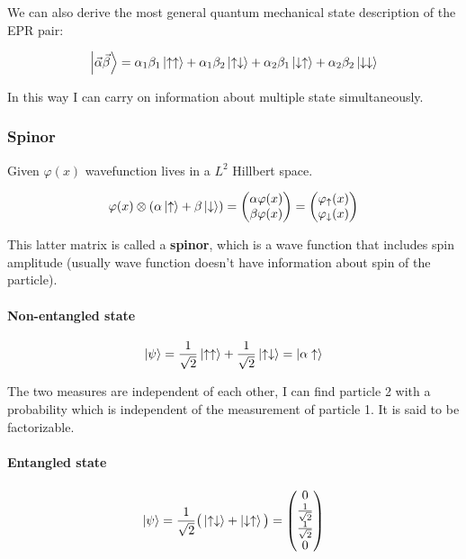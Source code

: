 		We can also derive the most general quantum mechanical state description of the EPR pair:

		$$\ket{\vec{\alpha}\vec{\beta}}=\alpha_1\beta_1\ket{\uparrow\uparrow}+\alpha_1\beta_2\ket{\uparrow\downarrow}+\alpha_2\beta_1\ket{\downarrow\uparrow}+\alpha_2\beta_2\ket{\downarrow\downarrow}$$

		In this way I can carry on information about multiple state simultaneously.

		\subsubsection{Spinor}
		Given $\varphi(x)$ wavefunction lives in a \emph{$L^2$} Hillbert space.

		$$\varphi(x)\otimes(\alpha\ket{\uparrow}+\beta\ket{\downarrow})=\begin{pmatrix}\alpha\varphi(x)\\\beta\varphi(x)\end{pmatrix}=\begin{pmatrix}\varphi_{\uparrow}(x)\\\varphi_{\downarrow}(x)\end{pmatrix}$$

		This latter matrix is called a \textbf{spinor}, which is a wave function that includes spin amplitude (usually wave function doesn't have information about spin of the particle).

			\paragraph{Non-entangled state}

			$$\ket{\psi}=\frac{1}{\sqrt{2}}\ket{\uparrow\uparrow}+\frac{1}{\sqrt{2}}\ket{\uparrow\downarrow}=\ket{\alpha\uparrow}$$

			The two measures are independent of each other, I can find particle 2 with a probability which is independent of the measurement of particle 1.
			It is said to be factorizable.

			\paragraph{Entangled state}

			$$\ket{\psi}=\frac{1}{\sqrt{2}}\big(\ket{\uparrow\downarrow}+\ket{\downarrow\uparrow}\big) = \begin{pmatrix}0\\\frac{1}{\sqrt{2}}\\\frac{1}{\sqrt{2}}\\0\end{pmatrix}$$

